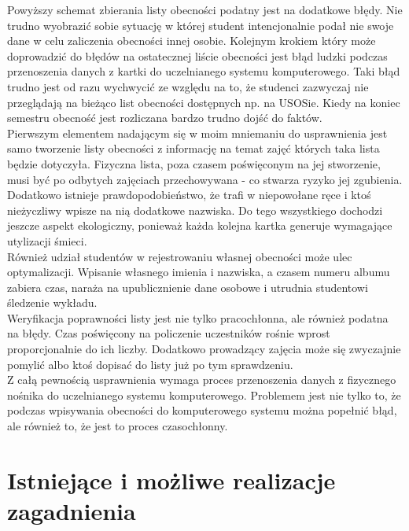 \documentclass[declaration,shortabstract, mgr]{iithesis}
\begin{document}
\indent Powyższy schemat zbierania listy obecności podatny jest na dodatkowe błędy. Nie trudno wyobrazić sobie sytuację w której student intencjonalnie podał nie swoje dane w celu zaliczenia obecności innej osobie. Kolejnym krokiem który może doprowadzić do błędów na ostatecznej liście obecności jest błąd ludzki podczas przenoszenia danych z kartki do uczelnianego systemu komputerowego. Taki błąd trudno jest od razu wychwycić ze względu na to, że studenci zazwyczaj nie przeglądają na bieżąco list obecności dostępnych np. na USOSie. Kiedy na koniec semestru obecność jest rozliczana bardzo trudno dojść do faktów.\\
\indent Pierwszym elementem nadającym się w moim mniemaniu do usprawnienia jest samo tworzenie listy obecności z informację na temat zajęć których taka lista będzie dotyczyła. Fizyczna lista, poza czasem poświęconym na jej stworzenie, musi być po odbytych zajęciach przechowywana - co stwarza ryzyko jej zgubienia. Dodatkowo istnieje prawdopodobieństwo, że trafi w niepowołane ręce i ktoś nieżyczliwy wpisze na nią dodatkowe nazwiska. Do tego wszystkiego dochodzi jeszcze aspekt ekologiczny, ponieważ każda kolejna kartka generuje wymagające utylizacji śmieci. \\
\indent Również udział studentów w rejestrowaniu własnej obecności może ulec optymalizacji. Wpisanie własnego imienia i nazwiska, a czasem numeru albumu zabiera czas, naraża na upublicznienie dane osobowe i utrudnia studentowi śledzenie wykładu.\\
\indent Weryfikacja poprawności listy jest nie tylko pracochłonna, ale również podatna na błędy. Czas poświęcony na policzenie uczestników rośnie wprost proporcjonalnie do ich liczby. Dodatkowo prowadzący zajęcia może się zwyczajnie pomylić albo ktoś dopisać do listy już po tym sprawdzeniu.\\
\indent Z całą pewnością usprawnienia wymaga proces przenoszenia danych z fizycznego nośnika do uczelnianego systemu komputerowego. Problemem jest nie tylko to, że podczas wpisywania obecności do komputerowego systemu można popełnić błąd, ale również to, że jest to proces czasochłonny.\\

\section{Istniejące i możliwe realizacje zagadnienia}
\end{document}
